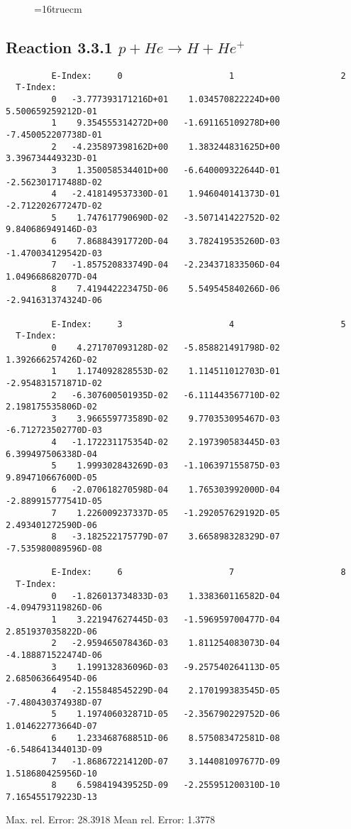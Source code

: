 \documentclass[12pt]{article}
\begin{document}
\begin{figure} \label{3.2.3b}
\epsfxsize=16truecm
\end{figure}
\newpage


\subsection{
Reaction 3.3.1  $  p + He \rightarrow H + He^+  $
}


\begin{small}\begin{verbatim}
         E-Index:     0                     1                     2
  T-Index:
         0   -3.777393171216D+01    1.034570822224D+00    5.500659259212D-01
         1    9.354555314272D+00   -1.691165109278D+00   -7.450052207738D-01
         2   -4.235897398162D+00    1.383244831625D+00    3.396734449323D-01
         3    1.350058534401D+00   -6.640009322644D-01   -2.562301717488D-02
         4   -2.418149537330D-01    1.946040141373D-01   -2.712202677247D-02
         5    1.747617790690D-02   -3.507141422752D-02    9.840686949146D-03
         6    7.868843917720D-04    3.782419535260D-03   -1.470034129542D-03
         7   -1.857520833749D-04   -2.234371833506D-04    1.049668682077D-04
         8    7.419442223475D-06    5.549545840266D-06   -2.941631374324D-06

         E-Index:     3                     4                     5
  T-Index:
         0    4.271707093128D-02   -5.858821491798D-02    1.392666257426D-02
         1    1.174092828553D-02    1.114511012703D-01   -2.954831571871D-02
         2   -6.307600501935D-02   -6.111443567710D-02    2.198175535806D-02
         3    3.966559773589D-02    9.770353095467D-03   -6.712723502770D-03
         4   -1.172231175354D-02    2.197390583445D-03    6.399497506338D-04
         5    1.999302843269D-03   -1.106397155875D-03    9.894710667600D-05
         6   -2.070618270598D-04    1.765303992000D-04   -2.889915777541D-05
         7    1.226009237337D-05   -1.292057629192D-05    2.493401272590D-06
         8   -3.182522175779D-07    3.665898328329D-07   -7.535980089596D-08

         E-Index:     6                     7                     8
  T-Index:
         0   -1.826013734833D-03    1.338360116582D-04   -4.094793119826D-06
         1    3.221947627445D-03   -1.596959700477D-04    2.851937035822D-06
         2   -2.959465078436D-03    1.811254083073D-04   -4.188871522474D-06
         3    1.199132836096D-03   -9.257540264113D-05    2.685063664954D-06
         4   -2.155848545229D-04    2.170199383545D-05   -7.480430374938D-07
         5    1.197406032871D-05   -2.356790229752D-06    1.014622773664D-07
         6    1.233468768851D-06    8.575083472581D-08   -6.548641344013D-09
         7   -1.868672214120D-07    3.144081097677D-09    1.518680425956D-10
         8    6.598419439525D-09   -2.255951200310D-10    7.165455179223D-13

\end{verbatim}\end{small}
  Max. rel. Error:  28.3918 %
  Mean rel. Error:   1.3778 %
\end{document}
